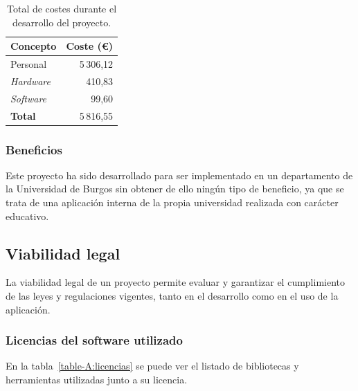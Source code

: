 \begin{table}
  \centering 
  \begin{tabular}{l r}
    \toprule
    \textbf{Concepto} & \textbf{Coste (€)} \\
    \midrule
    Personal & 5\,306,12 \\
	\textit{Hardware} & 410,83 \\
	\textit{Software} & 99,60\\
	\midrule
	\textbf{Total} & 5\,816,55 \\
	\bottomrule
  \end{tabular}
\caption{Total de costes durante el desarrollo del proyecto.}\label{table-A:economía}
\end{table}


\subsubsection{Beneficios}
Este proyecto ha sido desarrollado para ser implementado en un departamento de la Universidad de Burgos sin obtener de ello ningún tipo de beneficio, ya que se trata de una aplicación interna de la propia universidad realizada con carácter educativo.

\subsection{Viabilidad legal}
La viabilidad legal de un proyecto permite evaluar y garantizar el cumplimiento de las leyes y regulaciones vigentes, tanto en el desarrollo como en el uso de la aplicación.

\subsubsection{Licencias del software utilizado}

En la tabla~\ref{table-A:licencias} se puede ver el listado de bibliotecas y herramientas utilizadas junto a su licencia.

